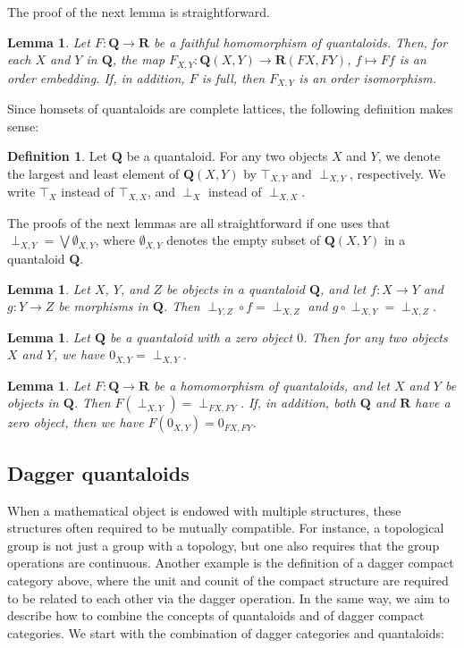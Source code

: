 \documentclass[12pt]{tac}
\newtheorem{lemma}[theorem]{Lemma}
\theoremstyle{definition}
\newtheorem{definition}[theorem]{Definition}
\theoremstyle{remark}
\newcommand{\<}{\langle}
\renewcommand{\>}{\rangle}
\renewcommand{\:}{\colon}
\begin{document}
The proof of the next lemma is straightforward.
\begin{lemma}\label{lem:fully faithful homomorphism of quantaloids}
Let $F:\mathbf{Q}\to\mathbf R$ be a faithful homomorphism of quantaloids. Then, for each $X$ and $Y$ in $\mathbf Q$, the map $F_{X,Y}:\mathbf Q(X,Y)\to\mathbf R(FX,FY)$, $f\mapsto Ff$ is an order embedding. If, in addition, $F$ is full, then $F_{X,Y}$ is an order isomorphism.
\end{lemma}




Since homsets of quantaloids are complete lattices, the following definition makes sense:


\begin{definition}
    Let $\mathbf Q$ be a quantaloid. For any two objects $X$ and $Y$, we denote the largest and least element of $\mathbf Q(X,Y)$ by $\top_{X,Y}$ and $\perp_{X,Y}$, respectively. We write $\top_X$ instead of $\top_{X,X}$, and $\perp_X$ instead of $\perp_{X,X}$.
\end{definition}
The proofs of the next lemmas are all straightforward if one uses that $\perp_{X,Y}=\bigvee\emptyset_{X,Y}$, where $\emptyset_{X,Y}$ denotes the empty subset of $\mathbf{Q}(X,Y)$ in a quantaloid $\mathbf Q$.
\begin{lemma}\label{lem:composition preserves least elements in quantaloids}
    Let $X$, $Y$, and $Z$ be objects in a quantaloid $\mathbf Q$, and let $f:X\to Y$ and $g:Y\to Z$ be morphisms in $\mathbf Q$. Then $\perp_{Y,Z}\circ f=\perp_{X,Z}$ and $g\circ\perp_{X,Y}=\perp_{X,Z}$.
\end{lemma}

\begin{lemma}\label{lem:quantaloid with zero}
Let $\mathbf Q$ be a quantaloid with a zero object $0$. Then for any two objects $X$ and $Y$, we have $0_{X,Y}=\perp_{X,Y}$.
\end{lemma}

\begin{lemma}\label{lem:quantaloid homomorphism preserves zero}
  Let $F:\mathbf Q\to\mathbf R$ be a homomorphism of quantaloids, and let $X$ and $Y$ be objects in $\mathbf Q$. Then  $F(\perp_{X,Y})=\perp_{FX,FY}$. If, in addition, both $\mathbf Q$ and $\mathbf R$ have a zero object, then we have $F(0_{X,Y})=0_{FX,FY}$.  
\end{lemma}


\subsection{Dagger quantaloids}
When a mathematical object is endowed with multiple structures, these structures often required to be mutually compatible. For instance, a topological group is not just a group with a topology, but one also requires that the group operations are continuous. Another example is the definition of a dagger compact category above, where the unit and counit of the compact structure are required to be related to each other via the dagger operation. In the same way, we aim to describe how to combine the concepts of quantaloids and of dagger compact categories. We start with the combination of dagger categories and quantaloids:
\end{document}
